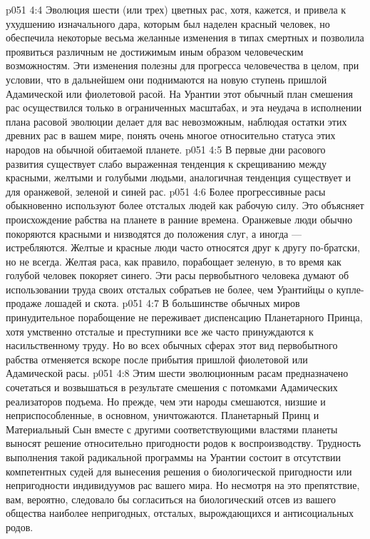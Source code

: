 \vs p051 4:4 Эволюция шести (или трех) цветных рас, хотя, кажется, и привела к ухудшению изначального дара, которым был наделен красный человек, но обеспечила некоторые весьма желанные изменения в типах смертных и позволила проявиться различным не достижимым иным образом человеческим возможностям. Эти изменения полезны для прогресса человечества в целом, при условии, что в дальнейшем они поднимаются на новую ступень пришлой Адамической или фиолетовой расой. На Урантии этот обычный план смешения рас осуществился только в ограниченных масштабах, и эта неудача в исполнении плана расовой эволюции делает для вас невозможным, наблюдая остатки этих древних рас в вашем мире, понять очень многое относительно статуса этих народов на обычной обитаемой планете.
\vs p051 4:5 \pc В первые дни расового развития существует слабо выраженная тенденция к скрещиванию между красными, желтыми и голубыми людьми, аналогичная тенденция существует и для оранжевой, зеленой и синей рас.
\vs p051 4:6 Более прогрессивные расы обыкновенно используют более отсталых людей как рабочую силу. Это объясняет происхождение рабства на планете в ранние времена. Оранжевые люди обычно покоряются красными и низводятся до положения слуг, а иногда --- истребляются. Желтые и красные люди часто относятся друг к другу по\hyp{}братски, но не всегда. Желтая раса, как правило, порабощает зеленую, в то время как голубой человек покоряет синего. Эти расы первобытного человека думают об использовании труда своих отсталых собратьев не более, чем Урантийцы о купле\hyp{}продаже лошадей и скота.
\vs p051 4:7 В большинстве обычных миров принудительное порабощение не переживает диспенсацию Планетарного Принца, хотя умственно отсталые и преступники все же часто принуждаются к насильственному труду. Но во всех обычных сферах этот вид первобытного рабства отменяется вскоре после прибытия пришлой фиолетовой или Адамической расы.
\vs p051 4:8 Этим шести эволюционным расам предназначено сочетаться и возвышаться в результате смешения с потомками Адамических реализаторов подъема. Но прежде, чем эти народы смешаются, низшие и неприспособленные, в основном, уничтожаются. Планетарный Принц и Материальный Сын вместе с другими соответствующими властями планеты выносят решение относительно пригодности родов к воспроизводству. Трудность выполнения такой радикальной программы на Урантии состоит в отсутствии компетентных судей для вынесения решения о биологической пригодности или непригодности индивидуумов рас вашего мира. Но несмотря на это препятствие, вам, вероятно, следовало бы согласиться на биологический отсев из вашего общества наиболее непригодных, отсталых, вырождающихся и антисоциальных родов.
